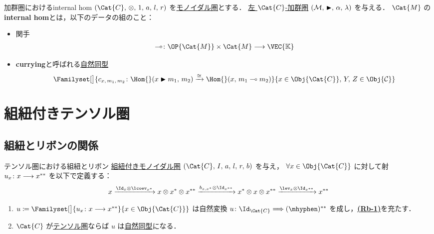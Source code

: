 \documentclass[TQFT_main]{subfiles}
\begin{document}
\begin{mydef}[label=def:internal-hom,breakable]{加群圏におけるinternal hom}
    $(\Cat{C},\, \otimes,\, 1,\, a,\, l,\, r)$ を\hyperref[redef:monoidal-category]{モノイダル圏}とする．
    \hyperref[def:modulecat]{左 $\Cat{C}$-加群圏} $(\mathcal{M},\, \blacktriangleright,\, \alpha,\, \lambda)$ を与える．
    $\Cat{M}$ の\textbf{internal hom}とは，以下のデータの組のこと：
    \begin{itemize}
        \item 関手
        \begin{align}
            \multimap \colon \OP{\Cat{M}} \times \Cat{M} \lto \VEC{\mathbb{K}}
        \end{align}
        \item 
        \textbf{currying}と呼ばれる\hyperref[def:nat]{自然同型}
        \begin{align}
            \Familyset[\big]{c_{x,\, m_1,\, m_2} \colon \Hom{}(x \btr m_1,\, m_2) \xrightarrow{\cong} \Hom{}(x,\, m_1 \multimap m_2)}{x \in \Obj{\Cat{C}},\, Y,\, Z \in \Obj{\mathcal{C}}}
        \end{align}
    \end{itemize}    
\end{mydef}

\section{組紐付きテンソル圏}

\subsection{組紐とリボンの関係}

\begin{mylem}[label=prop:braid-ribbon]{テンソル圏における組紐とリボン}
    \hyperref[redef:braided-monoidal]{組紐付きモノイダル圏} $(\Cat{C},\, I,\, a,\, l,\, r,\, b)$ を与え，
    $\forall x \in \Obj{\Cat{C}}$ に対して射 $u_x \colon x \longrightarrow x^{**}$ を以下で定義する：
    \begin{align}
        x \xrightarrow{\Id_x \otimes \lcoev_{x^*}} x \otimes x^* \otimes x^{**} \xrightarrow{b_{x,x^*} \otimes \Id_{x^{**}}} x^* \otimes x \otimes x^{**} \xrightarrow{\lev_x \otimes \Id_{x^{**}}} x^{**}
    \end{align}

    \begin{enumerate}
        \item $u \coloneqq \Familyset[\big]{u_x \colon x \lto x^{**}}{x \in \Obj{\Cat{C}}}$ は自然変換 $u \colon \Id_{\Cat{C}} \Longrightarrow (\mhyphen)^{**}$ を成し，\hyperref[def:ribbon]{\textsf{\textbf{(Rb-1)}}}を充たす．
        \item $\Cat{C}$ が\hyperref[def:tensorfusion-cat]{テンソル圏}ならば $u$ は\hyperref[def:nat]{自然同型}になる．
    \end{enumerate}
\end{mylem}
\end{document}

